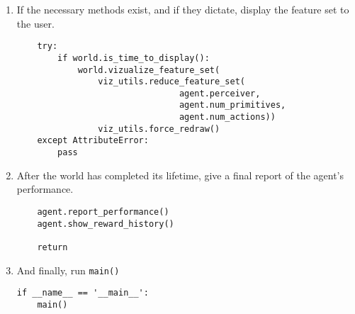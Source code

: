 \begin{enumerate}
\item
If the necessary methods exist, and if they dictate, display the feature set to the user.        
\begin{verbatim}    
    try:
        if world.is_time_to_display():                
            world.vizualize_feature_set(
                viz_utils.reduce_feature_set(
                                agent.perceiver, 
                                agent.num_primitives, 
                                agent.num_actions))
                viz_utils.force_redraw()
    except AttributeError:
        pass
    \end{verbatim}

\item
After the world has completed its lifetime, give a final report of the agent's performance.    
\begin{verbatim}    
    agent.report_performance()
    agent.show_reward_history()
    
    return
\end{verbatim}

\item
And finally, run \texttt{main()}    
\begin{verbatim}    
if __name__ == '__main__':
    main()
\end{verbatim}

\end{enumerate}

